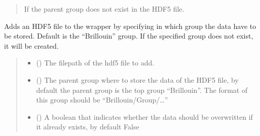 \documentclass[letterpaper,10pt,english]{sphinxmanual}
\begin{document}
\begin{fulllineitems}
\begin{fulllineitems}
\begin{quote}
\begin{description}
\sphinxAtStartPar
{} \textendash{} If the parent group does not exist in the HDF5 file.

\end{description}\end{quote}

\end{fulllineitems}


\begin{fulllineitems}
\label{\detokenize{_autosummary/HDF5_BLS.wrapper:HDF5_BLS.wrapper.Wrapper.add_hdf5}}
\pysigstartsignatures
\pysiglinewithargsret
{}
{\sphinxparamcomma {}\sphinxparamcomma {}}
{}
\pysigstopsignatures
\sphinxAtStartPar
Adds an HDF5 file to the wrapper by specifying in which group the data have to be stored. Default is the “Brillouin” group. If the specified group does not exist, it will be created.
\begin{quote}\begin{description}
\begin{itemize}
\item {} 
\sphinxAtStartPar
{} () \textendash{} The filepath of the hdf5 file to add.

\item {} 
\sphinxAtStartPar
{} (\sphinxstyleliteralemphasis{\sphinxupquote{, }}) \textendash{} The parent group where to store the data of the HDF5 file, by default the parent group is the top group “Brillouin”. The format of this group should be “Brillouin/Group/…”

\item {} 
\sphinxAtStartPar
{} (\sphinxstyleliteralemphasis{\sphinxupquote{, }}) \textendash{} A boolean that indicates whether the data should be overwritten if it already exists, by default False


\end{itemize}
\end{description}
\end{quote}
\end{fulllineitems}
\end{fulllineitems}
\end{document}
